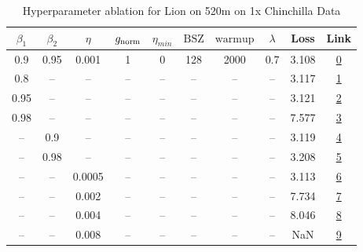 \begin{table}[H]
\centering
\caption{Hyperparameter ablation for Lion on 520m on 1x Chinchilla Data}
\label{tab:ablation_lion_520m_on_1x_chinchilla_data}
\begin{tabular}{cccccccccc}
\toprule
$\beta_1$ & $\beta_2$ & $\eta$ & $g_{\mathrm{norm}}$ & $\eta_{min}$ & $\mathrm{BSZ}$ & $\mathrm{warmup}$ & $\lambda$ & Loss & Link \\
\midrule
0.9 & 0.95 & 0.001 & 1 & 0 & 128 & 2000 & 0.7 & 3.108 & \href{https://wandb.ai/marin-community/optimizer-scaling/runs/sweep-520m-10B-liond8061alr0.001-wd0.7-minlr0-warmup2000-b10.9-b-942db7}{0} \\
\midrule
0.8 & -- & -- & -- & -- & -- & -- & -- & 3.117 & \href{https://wandb.ai/marin-community/optimizer-scaling/runs/sweep-520m-10B-lion6ebc4dlr0.001-wd0.7-minlr0-warmup2000-b10.8-b-edd66c}{1} \\
0.95 & -- & -- & -- & -- & -- & -- & -- & 3.121 & \href{https://wandb.ai/marin-community/optimizer-scaling/runs/sweep-520m-10B-lion6ee825lr0.001-wd0.7-minlr0-warmup2000-b10.95--60d07d}{2} \\
0.98 & -- & -- & -- & -- & -- & -- & -- & 7.577 & \href{https://wandb.ai/marin-community/optimizer-scaling/runs/sweep-520m-10B-lion98635alr0.001-wd0.7-minlr0-warmup2000-b10.98--391c82}{3} \\
-- & 0.9 & -- & -- & -- & -- & -- & -- & 3.119 & \href{https://wandb.ai/marin-community/optimizer-scaling/runs/sweep-520m-10B-lioncda5edlr0.001-wd0.7-minlr0-warmup2000-b10.9-b-2427cd}{4} \\
-- & 0.98 & -- & -- & -- & -- & -- & -- & 3.208 & \href{https://wandb.ai/marin-community/optimizer-scaling/runs/sweep-520m-10B-lion489f64lr0.001-wd0.7-minlr0-warmup2000-b10.9-b-5ffcf2}{5} \\
-- & -- & 0.0005 & -- & -- & -- & -- & -- & 3.113 & \href{https://wandb.ai/marin-community/optimizer-scaling/runs/sweep-520m-10B-lionfc33e8lr0.0005-wd0.7-minlr0-warmup2000-b10.9--6dcec6}{6} \\
-- & -- & 0.002 & -- & -- & -- & -- & -- & 7.734 & \href{https://wandb.ai/marin-community/optimizer-scaling/runs/sweep-520m-10B-lion2ece3elr0.002-wd0.7-minlr0-warmup2000-b10.9-b-cce61a}{7} \\
-- & -- & 0.004 & -- & -- & -- & -- & -- & 8.046 & \href{https://wandb.ai/marin-community/optimizer-scaling/runs/sweep-520m-10B-liony13cd19lr0.004-wd0.7-minlr0-warmup2000-b10.9--902a44}{8} \\
-- & -- & 0.008 & -- & -- & -- & -- & -- & NaN & \href{https://wandb.ai/marin-community/optimizer-scaling/runs/sweep-520m-10B-lionbfc5e9lr0.008-wd0.7-minlr0-warmup2000-b10.9-b-2bcac3}{9} \\

\end{tabular}
\end{table}
